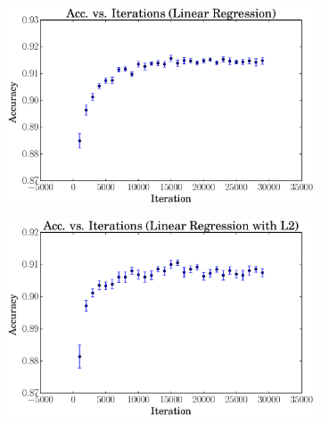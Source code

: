 \documentclass[a4paper, 12pt]{article}
\begin{document}
\begin{figure}[htpb]
    \centering
    \begin{subfigure}[htpb]{0.45\textwidth}
        \includegraphics[width=\textwidth]{acc_vs_iterations_linreg}
        \caption{}
        \label{fig:it_linreg}
    \end{subfigure}
    \begin{subfigure}[htpb]{0.45\textwidth}
        \includegraphics[width=\textwidth]{acc_vs_iterations_linregL2}
        \caption{}
        \label{fig:it_linregL2}
    \end{subfigure}
    \hfill %
    \begin{subfigure}[htpb]{0.45\textwidth}

\end{subfigure}
\end{figure}
\end{document}
